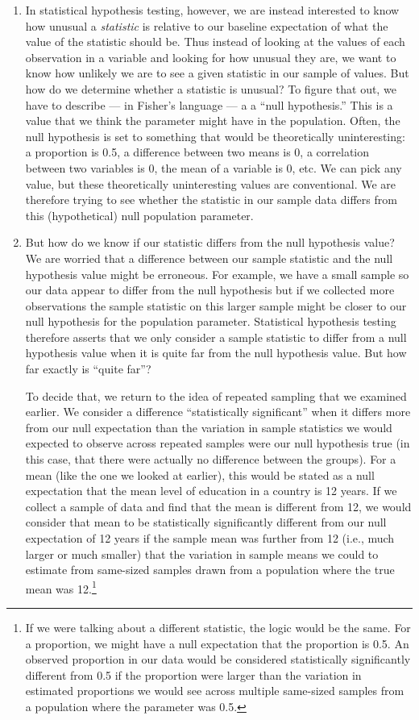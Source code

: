 \documentclass[a4paper,12pt]{article}
\begin{document}
\begin{enumerate}
\item In statistical hypothesis testing, however, we are instead interested to know how unusual a \textit{statistic} is relative to our baseline expectation of what the value of the statistic should be. Thus instead of looking at the values of each observation in a variable and looking for how unusual they are, we want to know how unlikely we are to see a given statistic in our sample of values. But how do we determine whether a statistic is unusual? To figure that out, we have to describe --- in Fisher's language --- a a ``null hypothesis.'' This is a value that we think the parameter might have in the population. Often, the null hypothesis is set to something that would be theoretically uninteresting: a proportion is 0.5, a difference between two means is 0, a correlation between two variables is 0, the mean of a variable is 0, etc. We can pick any value, but these theoretically uninteresting values are conventional. We are therefore trying to see whether the statistic in our sample data differs from this (hypothetical) null population parameter.

\item But how do we know if our statistic differs from the null hypothesis value? We are worried that a difference between our sample statistic and the null hypothesis value might be erroneous. For example, we have a small sample so our data appear to differ from the null hypothesis but if we collected more observations the sample statistic on this larger sample might be closer to our null hypothesis for the population parameter. Statistical hypothesis testing therefore asserts that we only consider a sample statistic to differ from a null hypothesis value when it is quite far from the null hypothesis value. But how far exactly is ``quite far''?

To decide that, we return to the idea of repeated sampling that we examined earlier. We consider a difference ``statistically significant'' when it differs more from our null expectation than the variation in sample statistics we would expected to observe across repeated samples were our null hypothesis true (in this case, that there were actually no difference between the groups). For a mean (like the one we looked at earlier), this would be stated as a null expectation that the mean level of education in a country is 12 years. If we collect a sample of data and find that the mean is different from 12, we would consider that mean to be statistically significantly different from our null expectation of 12 years if the sample mean was further from 12 (i.e., much larger or much smaller) that the variation in sample means we could to estimate from same-sized samples drawn from a population where the true mean was 12.\footnote{If we were talking about a different statistic, the logic would be the same. For a proportion, we might have a null expectation that the proportion is 0.5. An observed proportion in our data would be considered statistically significantly different from 0.5 if the proportion were larger than the variation in estimated proportions we would see across multiple same-sized samples from a population where the parameter was 0.5.} 


\end{enumerate}
\end{document}

